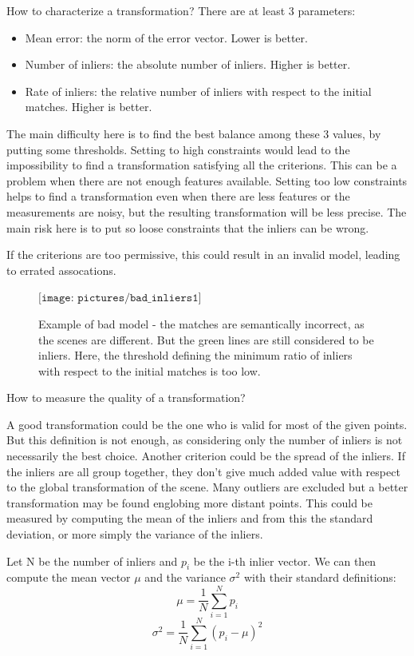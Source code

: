 How to characterize a transformation? There are at least 3 parameters:
\begin{itemize}
\item Mean error: the norm of the error vector. Lower is better.
\item Number of inliers: the absolute number of inliers. Higher is better.
\item Rate of inliers: the relative number of inliers with respect to the initial matches. Higher is better.
\end{itemize}

The main difficulty here is to find the best balance among these 3 values, by putting some thresholds. Setting to high constraints would lead to the impossibility to find a transformation satisfying all the criterions. This can be a problem when there are not enough features available. Setting too low constraints helps to find a transformation even when there are less features or the measurements are noisy, but the resulting transformation will be less precise. The main risk here is to put so loose constraints that the inliers can be wrong.

If the criterions are too permissive, this could result in an invalid model, leading to errated assocations. 

\begin{figure}[H]
\centering$
\texttt{[image: pictures/bad\_inliers1]}$
\caption{Example of bad model - the matches are semantically incorrect, as the scenes are different. But the green lines are still considered to be inliers. Here, the threshold defining the minimum ratio of inliers with respect to the initial matches is too low.}
\end{figure}

How to measure the quality of a transformation?

A good transformation could be the one who is valid for most of the given points. But this definition is not enough, as considering only the number of inliers is not necessarily the best choice. Another criterion could be the spread of the inliers. If the inliers are all group together, they don't give much added value with respect to the global transformation of the scene. Many outliers are excluded but a better transformation may be found englobing more distant points. This could be measured by computing the mean of the inliers and from this the standard deviation, or more simply the variance of the inliers.

Let N be the number of inliers and $p_i$ be the i-th inlier vector. We can then compute the mean vector $\mu$ and the variance $\sigma^2$ with their standard definitions:
\[
\mu = \frac{1}{N} \sum_{i=1}^N{p_i}
\]
\[
\sigma^2 = \frac{1}{N} \sum_{i=1}^N{(p_i - \mu)^2}
\]

